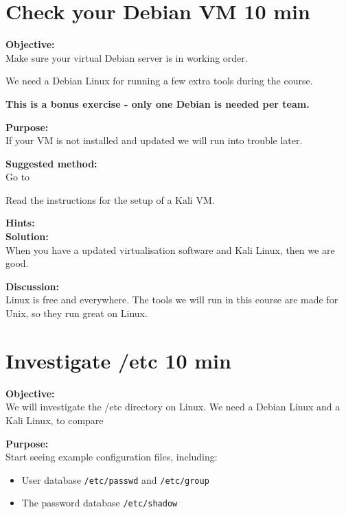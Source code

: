 \documentclass[a4paper,11pt,notitlepage]{report}
\begin{document}
\chapter{Check your Debian VM 10 min}
\label{ex:sw-basicDebianVM}


{\bf Objective:}\\
Make sure your virtual Debian server is in working order.

We need a Debian Linux for running a few extra tools during the course.

{\Large \bf This is a bonus exercise - only one Debian is needed per team.}

{\bf Purpose:}\\
If your VM is not installed and updated we will run into trouble later.

{\bf Suggested method:}\\
Go to 

Read the instructions for the setup of a Kali VM.

{\bf Hints:}\\

{\bf Solution:}\\
When you have a updated virtualisation software and Kali Linux, then we are good.

{\bf Discussion:}\\
Linux is free and everywhere. The tools we will run in this course are made for Unix, so they run great on Linux.



\chapter{Investigate /etc 10 min}
\label{ex:sw-basicLinuxetc}


{\bf Objective:}\\
We will investigate the /etc directory on Linux. We need a Debian Linux and a Kali Linux, to compare

{\bf Purpose:}\\
Start seeing example configuration files, including:
\begin{itemize}
  \item User database \verb+/etc/passwd+ and \verb+/etc/group+
  \item The password database \verb+/etc/shadow+
\end{itemize}
\end{document}

